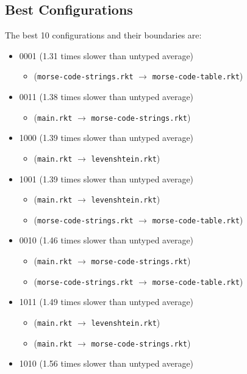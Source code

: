\documentclass{article}
\newcommand{\mono}[1]{\texttt{#1}}
\begin{document}
\subsection{Best Configurations}
The best 10 configurations and their boundaries are:
\begin{itemize}
\item 0001 (1.31 times slower than untyped average)
  \begin{itemize}
  \item (\mono{morse-code-strings.rkt} $\rightarrow$ \mono{morse-code-table.rkt})
  \end{itemize}
\item 0011 (1.38 times slower than untyped average)
  \begin{itemize}
  \item (\mono{main.rkt} $\rightarrow$ \mono{morse-code-strings.rkt})
  \end{itemize}
\item 1000 (1.39 times slower than untyped average)
  \begin{itemize}
  \item (\mono{main.rkt} $\rightarrow$ \mono{levenshtein.rkt})
  \end{itemize}
\item 1001 (1.39 times slower than untyped average)
  \begin{itemize}
  \item (\mono{main.rkt} $\rightarrow$ \mono{levenshtein.rkt})
  \item (\mono{morse-code-strings.rkt} $\rightarrow$ \mono{morse-code-table.rkt})
  \end{itemize}
\item 0010 (1.46 times slower than untyped average)
  \begin{itemize}
  \item (\mono{main.rkt} $\rightarrow$ \mono{morse-code-strings.rkt})
  \item (\mono{morse-code-strings.rkt} $\rightarrow$ \mono{morse-code-table.rkt})
  \end{itemize}
\item 1011 (1.49 times slower than untyped average)
  \begin{itemize}
  \item (\mono{main.rkt} $\rightarrow$ \mono{levenshtein.rkt})
  \item (\mono{main.rkt} $\rightarrow$ \mono{morse-code-strings.rkt})
  \end{itemize}
\item 1010 (1.56 times slower than untyped average)

\end{itemize}
\end{document}
